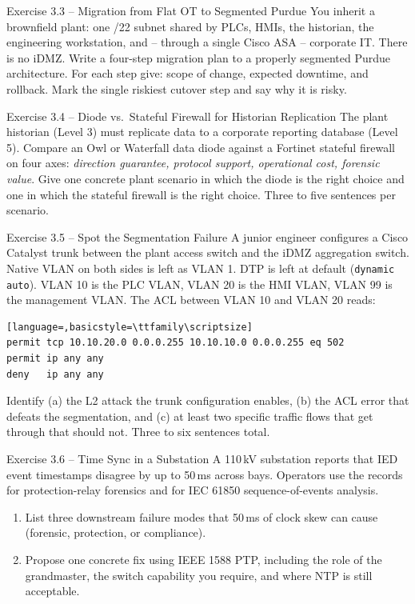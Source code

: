 \documentclass[11pt,a4paper]{article}
\begin{document}
\begin{taskbox}{Exercise 3.3 -- Migration from Flat OT to Segmented Purdue}
You inherit a brownfield plant: one /22 subnet shared by PLCs, HMIs, the historian, the engineering workstation, and -- through a single Cisco ASA -- corporate IT. There is no iDMZ. Write a four-step migration plan to a properly segmented Purdue architecture. For each step give: scope of change, expected downtime, and rollback. Mark the single riskiest cutover step and say why it is risky.
\end{taskbox}

\begin{taskbox}{Exercise 3.4 -- Diode vs.\ Stateful Firewall for Historian Replication}
The plant historian (Level 3) must replicate data to a corporate reporting database (Level 5). Compare an Owl or Waterfall data diode against a Fortinet stateful firewall on four axes: \emph{direction guarantee, protocol support, operational cost, forensic value}. Give one concrete plant scenario in which the diode is the right choice and one in which the stateful firewall is the right choice. Three to five sentences per scenario.
\end{taskbox}

\begin{taskbox}{Exercise 3.5 -- Spot the Segmentation Failure}
A junior engineer configures a Cisco Catalyst trunk between the plant access switch and the iDMZ aggregation switch. Native VLAN on both sides is left as VLAN 1. DTP is left at default (\texttt{dynamic auto}). VLAN 10 is the PLC VLAN, VLAN 20 is the HMI VLAN, VLAN 99 is the management VLAN. The ACL between VLAN 10 and VLAN 20 reads:
\begin{lstlisting}[language=,basicstyle=\ttfamily\scriptsize]
permit tcp 10.10.20.0 0.0.0.255 10.10.10.0 0.0.0.255 eq 502
permit ip any any
deny   ip any any
\end{lstlisting}
Identify (a) the L2 attack the trunk configuration enables, (b) the ACL error that defeats the segmentation, and (c) at least two specific traffic flows that get through that should not. Three to six sentences total.
\end{taskbox}

\begin{taskbox}{Exercise 3.6 -- Time Sync in a Substation}
A 110\,kV substation reports that IED event timestamps disagree by up to 50\,ms across bays. Operators use the records for protection-relay forensics and for IEC 61850 sequence-of-events analysis.
\begin{enumerate}\setlength{\itemsep}{1pt}
  \item List three downstream failure modes that 50\,ms of clock skew can cause (forensic, protection, or compliance).
  \item Propose one concrete fix using IEEE 1588 PTP, including the role of the grandmaster, the switch capability you require, and where NTP is still acceptable.
\end{enumerate}
\end{taskbox}
\end{document}
